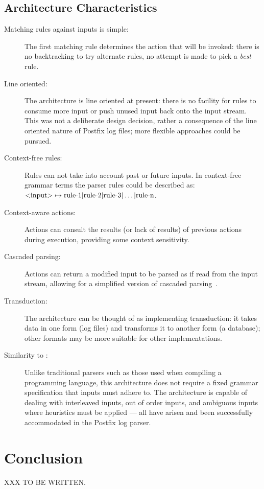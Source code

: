 \subsection{Architecture Characteristics}

\label{Architecture characteristics}

\begin{description}

    \item [Matching rules against inputs is simple:]  The first matching
        rule determines the action that will be invoked: there is no
        backtracking to try alternate rules, no attempt is made to pick a
        \textit{best\/} rule.

    \item [Line oriented:]  The architecture is line oriented at present:
        there is no facility for rules to consume more input or push unused
        input back onto the input stream.  This was not a deliberate design
        decision, rather a consequence of the line oriented nature of
        Postfix log files; more flexible approaches could be pursued.

    \item [Context-free rules:]  Rules can not take into account past or
        future inputs.  In context-free grammar terms the parser rules
        could be described as:
        \newline{}$\text{\textless{}input\textgreater{}} \mapsto
        \text{rule-1} | \text{rule-2} | \text{rule-3} | \dots |
        \text{rule-n}$.

    \item [Context-aware actions:] Actions can consult the results (or lack
        of results) of previous actions during execution, providing some
        context sensitivity.  
        
    \item [Cascaded parsing:] Actions can return a modified input to be
        parsed as if read from the input stream, allowing for a simplified
        version of cascaded parsing~\cite{cascaded-parsing}.

    \item [Transduction:]  The architecture can be thought of as
        implementing transduction: it takes data in one form (log files)
        and transforms it to another form (a database); other formats may
        be more suitable for other implementations.

    \item [Similarity to :] \hfill{} \newline{}
        Unlike traditional parsers such as those used when compiling a
        programming language, this architecture does not require a fixed
        grammar specification that inputs must adhere to.  The architecture
        is capable of dealing with interleaved inputs, out of order inputs,
        and ambiguous inputs where heuristics must be applied --- all have
        arisen and been successfully accommodated in the Postfix log
        parser.

\end{description}


\section{Conclusion}

XXX TO BE WRITTEN\@.

